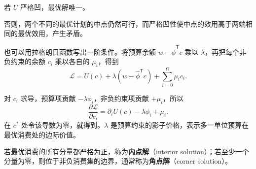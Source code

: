 若 $U$ 严格凹，最优解唯一。
\begin{solution}[label-content={证明},blank-type=none]
否则，两个不同的最优计划的中点仍然可行，而严格凹性使中点的效用高于两端相同的最优效用，产生矛盾。
\end{solution}

也可以用拉格朗日函数写出一阶条件。将预算余额 $w-\hat\phi^{\mathsf T}c$ 乘以 $\lambda$，再把每个非负约束的余额 $c_i$ 乘以各自的 $\mu_i$，得到
\[
 \mathcal L=U(c)+\lambda(w-\hat\phi^{\mathsf T}c)+\sum_{i=0}^{\Omega}\mu_i c_i.
\]

对 $c_i$ 求导，预算项贡献 $-\lambda\phi_i$，非负约束项贡献 $+\mu_i$，所以
\[
 \frac{\partial\mathcal L}{\partial c_i}
 =\partial_iU(c)-\lambda\phi_i+\mu_i.
\]
在 $c^*$ 处令该导数为零，就得到。$\lambda$ 是预算约束的影子价格，表示多一单位预算在最优消费处的边际价值。

\begin{tcolorbox}[knowledge,title=内点解与角点解]
若最优消费的所有分量都严格为正，称为\textbf{内点解}（interior solution）；若至少一个分量为零，则位于非负消费集的边界，通常称为\textbf{角点解}（corner solution）。
\end{tcolorbox}


